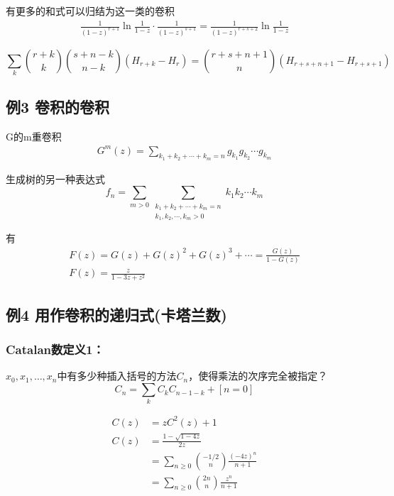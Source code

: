 有更多的和式可以归结为这一类的卷积
\begin{align*}
    \frac{1}{(1-z)^{r+1}} \ln \frac{1}{1-z} \cdot \frac{1}{(1-z)^{s+1}}=\frac{1}{(1-z)^{r+s+2}} \ln \frac{1}{1-z}
\end{align*}

\begin{equation}
    \sum_{k}{r+k \choose k}{s+n-k  \choose n-k}\left(H_{r+k}-H_{r}\right)={r+s+n+1  \choose n}\left(H_{r+s+n+1}-H_{r+s+1}\right)
\end{equation}

\subsection{例3 卷积的卷积}
G的m重卷积
\begin{align*}
    [z^n]G^m(z) = \sum_{k_{1}+k_{2}+\cdots+k_{m}=n} g_{k_{1}} g_{k_{2}} \cdots g_{k_{m}}
\end{align*}

生成树的另一种表达式
\begin{equation}
    f_{n}=\sum_{m>0} \sum_{\substack{k_{1}+k_{2}+\cdots+k_{m}=n \\ k_{1}, k_{2}, \cdots, k_{m}>0}} k_{1} k_{2} \cdots k_{m}
\end{equation}

有
\begin{align*}
    F(z)=G(z)+G(z)^{2}+G(z)^{3}+\cdots=\frac{G(z)}{1-G(z)} \\
    F(z)=\frac{z}{1-3 z+z^{2}}
\end{align*}

\subsection{例4 用作卷积的递归式(卡塔兰数)}

\subsubsection*{Catalan数定义1：}
$x_0, x_1, \dots, x_n$中有多少种插入括号的方法$C_n$，使得乘法的次序完全被指定？
\setcounter{equation}{65}
\begin{equation}
    C_{n}=\sum_{k} C_{k} C_{n-1-k}+[n=0]
\end{equation}

\begin{align*}
    C(z) &= zC^2(z) + 1 \\
    C(z) &=\frac{1-\sqrt{1-4 z}}{2 z} \\
        &=\sum_{n \geqslant 0}{-1 / 2  \choose n} \frac{(-4 z)^{n}}{n+1}\\
        & =\sum_{n \geqslant 0}{2 n  \choose n} \frac{z^{n}}{n+1}
\end{align*}

